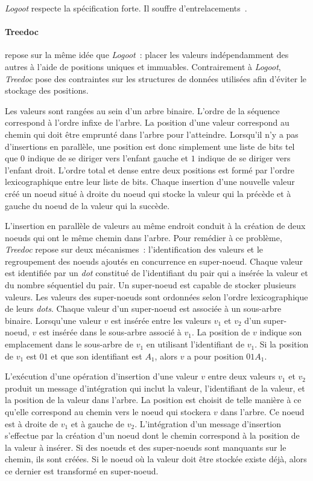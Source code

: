 \emph{Logoot} respecte la spécification forte.
Il souffre d'entrelacements~\autocite{kleppmann2019_interleaving}.


\paragraph{Treedoc}\autocite{preguica_2009_treedoc} repose sur la même idée que \emph{Logoot}~: placer les valeurs indépendamment des autres à l'aide de positions uniques et immuables.
Contrairement à \emph{Logoot}, \emph{Treedoc} pose des contraintes sur les structures de données utilisées afin d'éviter le stockage des positions.

Les valeurs sont rangées au sein d'un arbre binaire.
L'ordre de la séquence correspond à l'ordre infixe de l'arbre.
La position d'une valeur correspond au chemin qui doit être emprunté dans l'arbre pour l'atteindre.
Lorsqu'il n'y a pas d'insertions en parallèle, une position est donc simplement une liste de bits tel que $0$ indique de se diriger vers l'enfant gauche et $1$ indique de se diriger vers l'enfant droit.
L'ordre total et dense entre deux positions est formé par l'ordre lexicographique entre leur liste de bits.
Chaque insertion d'une nouvelle valeur créé un noeud situé à droite du noeud qui stocke la valeur qui la précède et à gauche du noeud de la valeur qui la succède.

L'insertion en parallèle de valeurs au même endroit conduit à la création de deux noeuds qui ont le même chemin dans l'arbre.
Pour remédier à ce problème, \emph{Treedoc} repose sur deux mécanismes~: l'identification des valeurs et le regroupement des noeuds ajoutés en concurrence en super-noeud.
Chaque valeur est identifiée par un \emph{dot} constitué de l'identifiant du pair qui a insérée la valeur et du nombre séquentiel du pair.
Un super-noeud est capable de stocker plusieurs valeurs.
Les valeurs des super-noeuds sont ordonnées selon l'ordre lexicographique de leurs \emph{dots}.
Chaque valeur d'un super-noeud est associée à un sous-arbre binaire.
Lorsqu'une valeur $v$ est insérée entre les valeurs $v_1$ et $v_2$ d'un super-noeud, $v$ est insérée dans le sous-arbre associé à $v_1$.
La position de $v$ indique son emplacement dans le sous-arbre de $v_1$ en utilisant l'identifiant de $v_1$.
Si la position de $v_1$ est $01$ et que son identifiant est $A_1$, alors $v$ a pour position $01A_1$.

L'exécution d'une opération d'insertion d'une valeur $v$ entre deux valeurs $v_1$ et $v_2$ produit un message d'intégration qui inclut la valeur, l'identifiant de la valeur, et la position de la valeur dans l'arbre.
La position est choisit de telle manière à ce qu'elle correspond au chemin vers le noeud qui stockera $v$ dans l'arbre.
Ce noeud est à droite de $v_1$ et à gauche de $v_2$.
L'intégration d'un message d'insertion s'effectue par la création d'un noeud dont le chemin correspond à la position de la valeur à insérer.
Si des noeuds et des super-noeuds sont manquants sur le chemin, ils sont créées.
Si le noeud où la valeur doit être stockée existe déjà, alors ce dernier est transformé en super-noeud.

